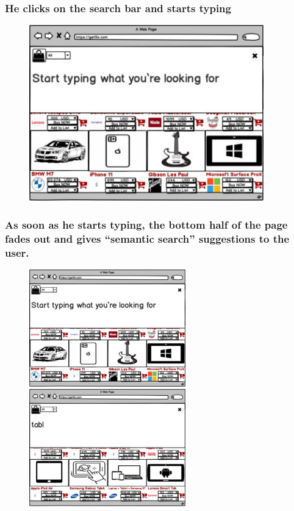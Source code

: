 \documentclass[]{article}
\begin{document}
\hypertarget{he-clicks-on-the-search-bar-and-starts-typing}{%
    \subsubsection{He clicks on the search bar and starts
        typing}\label{he-clicks-on-the-search-bar-and-starts-typing}}

\begin{figure}[H]
    \centering
    \includegraphics[height=3in]{./images/37.jpg}
\end{figure}

\hypertarget{as-soon-as-he-starts-typing-the-bottom-half-of-the-page-fades-out-and-gives-semantic-search-suggestions-to-the-user.}{%
    \subsubsection{As soon as he starts typing, the bottom half of the page
        fades out and gives ``semantic search'' suggestions to the
        user.}\label{as-soon-as-he-starts-typing-the-bottom-half-of-the-page-fades-out-and-gives-semantic-search-suggestions-to-the-user.}}

\begin{figure}[H]
    \centering
    \includegraphics[height=2in]{./images/37.jpg}
    \includegraphics[height=2in]{./images/38.jpg}
\end{figure}
\end{document}
